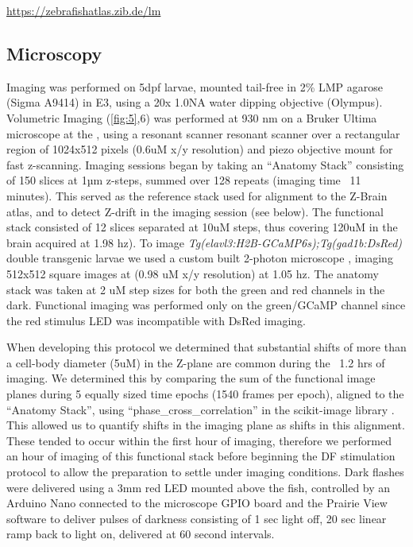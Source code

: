 \documentclass[9pt,lineno]{RandlettLab_elife}
\begin{document}
\href{https://zebrafishatlas.zib.de/lm}{https://zebrafishatlas.zib.de/lm}


\subsection{Microscopy}

Imaging was performed on 5dpf larvae, mounted tail-free in 2\% LMP agarose (Sigma A9414) in E3, using a 20x 1.0NA water dipping objective (Olympus). Volumetric Imaging (\autoref{fig:5},6)  was performed at 930 nm on a Bruker Ultima microscope at the , using a resonant scanner resonant scanner over a rectangular region of 1024x512 pixels (0.6uM x/y resolution) and piezo objective mount for fast z-scanning. Imaging sessions began by taking an “Anatomy Stack” consisting of 150 slices at 1µm z-steps, summed over 128 repeats (imaging time ~11 minutes). This served as the reference stack used for alignment to the Z-Brain atlas, and to detect Z-drift in the imaging session (see below). The functional stack consisted of 12 slices separated at 10uM steps, thus covering 120uM in the brain acquired at  1.98 hz). To image \emph{Tg(elavl3:H2B-GCaMP6s);Tg(gad1b:DsRed)} double transgenic larvae we used a custom built 2-photon microscope \cite{Haesemeyer2018-ww}, imaging 512x512 square images at (0.98 uM x/y resolution) at 1.05 hz. The anatomy stack was taken at 2 uM step sizes for both the green and red channels in the dark. Functional imaging was performed only on the green/GCaMP channel since the red stimulus LED was incompatible with DsRed imaging. 

When developing this protocol we determined that substantial shifts of more than a cell-body diameter (5uM) in the Z-plane are common during the ~1.2 hrs of imaging. We determined this by comparing the sum of the functional image planes during 5 equally sized time epochs (1540 frames per epoch), aligned to the “Anatomy Stack”, using “phase\_cross\_correlation” in the scikit-image library \cite{Van_der_Walt2014-hx}. This allowed us to quantify shifts in the imaging plane as shifts in this alignment.  These tended to occur within the first hour of imaging, therefore we performed an hour of imaging of this functional stack before beginning the DF stimulation protocol to allow the preparation to settle under imaging conditions. Dark flashes were delivered using a 3mm red LED mounted above the fish, controlled by an Arduino Nano connected to the microscope GPIO board and the Prairie View software to deliver pulses of darkness consisting of 1 sec light off, 20 sec linear ramp back to light on, delivered at 60 second intervals. 
\end{document}
